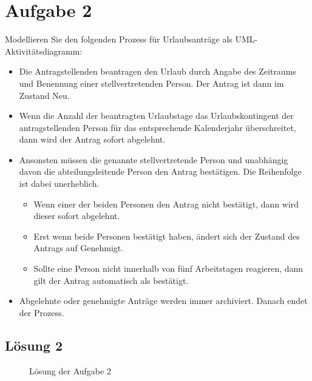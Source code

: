 \documentclass[main.tex]{subfiles}
\begin{document}
\section{Aufgabe 2}
Modellieren Sie den folgenden Prozess für Urlaubsanträge als UML-Aktivitätsdiagramm:

\begin{itemize}
    \item Die Antragstellenden beantragen den Urlaub durch Angabe des Zeitraums und Benennung einer stellvertretenden Person. Der Antrag ist dann im Zustand Neu.
    \item Wenn die Anzahl der beantragten Urlaubstage das Urlaubskontingent der antragstellenden Person für das entsprechende Kalenderjahr überschreitet, dann wird der Antrag sofort abgelehnt.
    \item Ansonsten müssen die genannte stellvertretende Person und unabhängig davon die abteilungsleitende Person den Antrag bestätigen. Die Reihenfolge ist dabei unerheblich.
    \begin{itemize}
        \item Wenn einer der beiden Personen den Antrag nicht bestätigt, dann wird dieser sofort abgelehnt.
        \item Erst wenn beide Personen bestätigt haben, ändert sich der Zustand des Antrags auf Genehmigt.
        \item Sollte eine Person nicht innerhalb von fünf Arbeitstagen reagieren, dann gilt der Antrag automatisch als bestätigt.
    \end{itemize}
    \item Abgelehnte oder genehmigte Anträge werden immer archiviert. Danach endet der Prozess.
\end{itemize}


\subsection{Lösung 2}
\begin{figure}[h]
    \caption{Lösung der Aufgabe 2}
    \label{fig:lgs2}
\end{figure}
\end{document}
